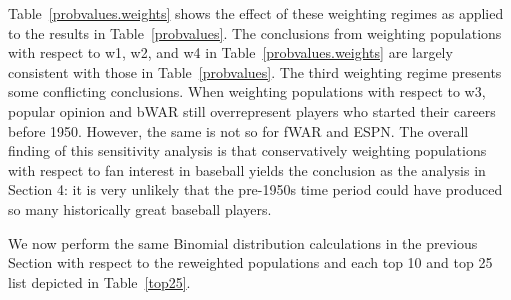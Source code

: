 \documentclass[11pt]{article}\usepackage[]{graphicx}\usepackage[]{color}
\begin{document}
Table~\ref{probvalues.weights} shows the effect of these weighting regimes as 
applied to the results in Table~\ref{probvalues}.  
The conclusions from weighting populations with respect to w1, w2, and w4 in 
Table~\ref{probvalues.weights} are largely consistent with those in 
Table~\ref{probvalues}.  %
The third weighting regime presents some conflicting conclusions.  When 
weighting populations with respect to w3, popular opinion and 
bWAR still overrepresent players who started their careers before 1950.  
However, the same is not so for fWAR and ESPN. 
The overall finding of this sensitivity analysis is that conservatively 
weighting populations with respect to fan interest in baseball yields the 
conclusion as the analysis in Section 4:
it is very unlikely that the pre-1950s time period could 
have produced so many historically great baseball players.  

We now perform the same Binomial distribution calculations in the previous 
Section with respect to the reweighted populations and each top 10 and top 25 
list depicted in Table~\ref{top25}. %
\end{document}
